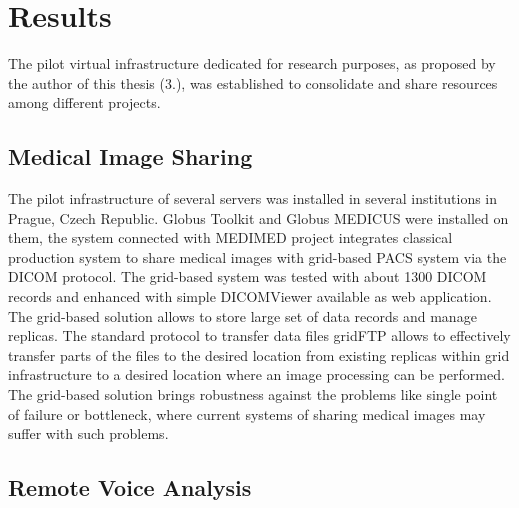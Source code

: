 \chapter{Results}
\label{sec:results}
The pilot virtual infrastructure dedicated for research purposes, as proposed by the author of this thesis (3.), was established to consolidate and share resources among different projects. 
\section{Medical Image Sharing}
\label{sec:resultsimages}

The pilot infrastructure of several servers was installed in several institutions in Prague, Czech Republic. Globus Toolkit and Globus MEDICUS were installed on them,
the system connected with MEDIMED project integrates classical production system to share medical images with grid-based PACS system via the DICOM protocol. The grid-based system was tested with about 1300 DICOM records and enhanced with simple DICOMViewer available as web application. 
The grid-based solution allows to store large set of data records and manage replicas. The standard protocol to transfer data files gridFTP allows to effectively transfer parts of the files to the desired location from existing replicas within grid infrastructure to a desired location where an image processing can be performed. The grid-based solution brings robustness against the problems like single point of failure or bottleneck, where current systems of sharing medical images may suffer with such problems.

\section{Remote Voice Analysis}
\label{sec:resultsvoice}

